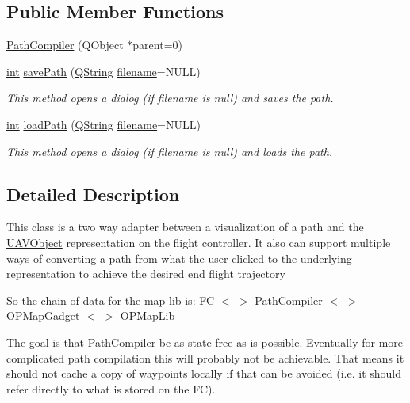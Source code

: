 \subsection*{Public Member Functions}
\begin{DoxyCompactItemize}
\item 
\hyperlink{group___o_p_map_plugin_ga9270b91f203f6c656318dbfb7b6f0d2d}{Path\-Compiler} (Q\-Object $\ast$parent=0)
\item 
\hyperlink{ioapi_8h_a787fa3cf048117ba7123753c1e74fcd6}{int} \hyperlink{group___o_p_map_plugin_gadd7f57ff007094b9434d1864b52c13ad}{save\-Path} (\hyperlink{group___u_a_v_objects_plugin_gab9d252f49c333c94a72f97ce3105a32d}{Q\-String} \hyperlink{ioapi_8h_a7a03a664b090ce5c848ecb31cb4a2fa8}{filename}=N\-U\-L\-L)
\begin{DoxyCompactList}\small\item\em This method opens a dialog (if filename is null) and saves the path. \end{DoxyCompactList}\item 
\hyperlink{ioapi_8h_a787fa3cf048117ba7123753c1e74fcd6}{int} \hyperlink{group___o_p_map_plugin_ga6fb97167102fdadaeadd9d6686c3aea0}{load\-Path} (\hyperlink{group___u_a_v_objects_plugin_gab9d252f49c333c94a72f97ce3105a32d}{Q\-String} \hyperlink{ioapi_8h_a7a03a664b090ce5c848ecb31cb4a2fa8}{filename}=N\-U\-L\-L)
\begin{DoxyCompactList}\small\item\em This method opens a dialog (if filename is null) and loads the path. \end{DoxyCompactList}\end{DoxyCompactItemize}


\subsection{Detailed Description}
This class is a two way adapter between a visualization of a path and the \hyperlink{class_u_a_v_object}{U\-A\-V\-Object} representation on the flight controller. It also can support multiple ways of converting a path from what the user clicked to the underlying representation to achieve the desired end flight trajectory

So the chain of data for the map lib is\-: F\-C $<$-\/$>$ \hyperlink{class_path_compiler}{Path\-Compiler} $<$-\/$>$ \hyperlink{class_o_p_map_gadget}{O\-P\-Map\-Gadget} $<$-\/$>$ O\-P\-Map\-Lib

The goal is that \hyperlink{class_path_compiler}{Path\-Compiler} be as state free as is possible. Eventually for more complicated path compilation this will probably not be achievable. That means it should not cache a copy of waypoints locally if that can be avoided (i.\-e. it should refer directly to what is stored on the F\-C).

